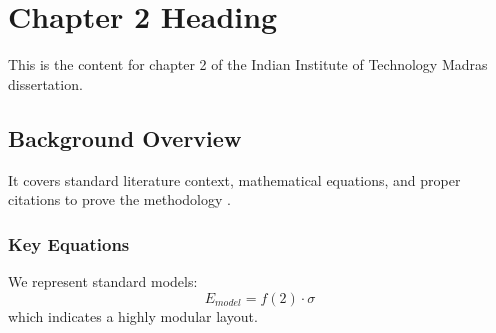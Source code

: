 \chapter{Chapter 2 Heading}
\label{ch:chapter2}
This is the content for chapter 2 of the Indian Institute of Technology Madras dissertation.

\section{Background Overview}
It covers standard literature context, mathematical equations, and proper citations to prove the methodology \cite{texbook}.

\subsection{Key Equations}
We represent standard models:
\begin{equation}
    E_{model} = f(2) \cdot \sigma
\end{equation}
which indicates a highly modular layout.
